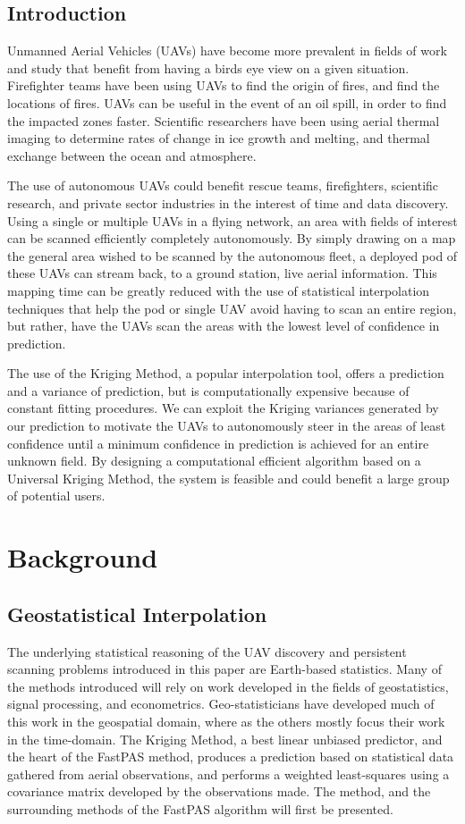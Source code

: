 \documentclass[11pt]{ucthesis}
\begin{document}
\chapter{Introduction}
Unmanned Aerial Vehicles (UAVs) have become more prevalent in fields of work and study that benefit from having a birds eye view on a given situation. Firefighter teams have been using UAVs to find the origin of fires, and find the locations of fires. UAVs can be useful in the event of an oil spill, in order to find the impacted zones faster. Scientific researchers have been using aerial thermal imaging to determine rates of change in ice growth and melting, and thermal exchange between the ocean and atmosphere.
\par
The use of autonomous UAVs could benefit rescue teams, firefighters, scientific research, and private sector industries in the interest of time and data discovery. Using a single or multiple UAVs in a flying network, an area with fields of interest can be scanned efficiently completely autonomously. By simply drawing on a map the general area wished to be scanned by the autonomous fleet, a deployed pod of these UAVs can stream back, to a ground station, live aerial information. This mapping time can be greatly reduced with the use of statistical interpolation techniques that help the pod or single UAV avoid having to scan an entire region, but rather, have the UAVs scan the areas with the lowest level of confidence in prediction.
\par
The use of the Kriging Method, a popular interpolation tool, offers a prediction and a variance of prediction, but is computationally expensive because of constant fitting procedures. We can exploit the Kriging variances generated by our prediction to motivate the UAVs to autonomously steer in the areas of least confidence until a minimum confidence in prediction is achieved for an entire unknown field. By designing a computational efficient algorithm based on a Universal Kriging Method, the system is feasible and could benefit a large group of potential users.

\part{Background}
\chapter{Geostatistical Interpolation}
The underlying statistical reasoning of the UAV discovery and persistent scanning problems introduced in this paper are Earth-based statistics. Many of the methods introduced will rely on work developed in the fields of geostatistics, signal processing, and econometrics. Geo-statisticians have developed much of this work in the geospatial domain, where as the others mostly focus their work in the time-domain. The Kriging Method, a best linear unbiased predictor, and the heart of the FastPAS method, produces a prediction based on statistical data gathered from aerial observations, and performs a weighted least-squares using a covariance matrix developed by the observations made. The method, and the surrounding methods of the FastPAS algorithm will first be presented.
\end{document}
